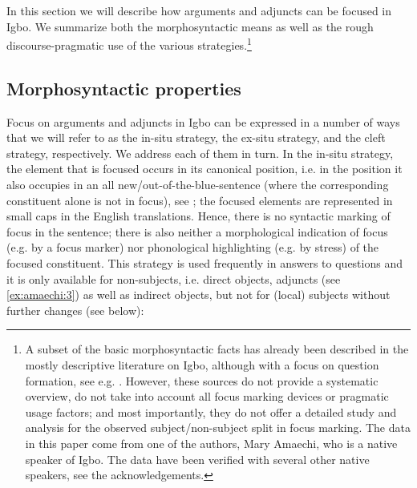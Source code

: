 \documentclass[output=paper,colorlinks,citecolor=brown]{langscibook}
\begin{document}
In this section we will describe how arguments and adjuncts can be focused in Igbo. We summarize both the morphosyntactic means as well as the rough discourse-pragmatic use of the various strategies.\footnote{A subset of the basic morphosyntactic facts has already been described in the mostly descriptive literature on Igbo, although with a focus on question formation, see e.g. \citet{Goldsmith1981, Ikekeonwu1987, Uwalaka1991, Mmaduagwu2012, Nwankwegu2015}. However, these sources do not provide a systematic overview, do not take into account all focus marking devices or pragmatic usage factors; and most importantly, they do not offer a detailed study and analysis for the observed  subject\slash non-subject split in focus marking. The data in this paper come from one of the authors, Mary Amaechi, who is a native speaker of Igbo. The data have been verified with several other native speakers, see the acknowledgements.}

\subsection{Morphosyntactic properties}\label{sec:amaechi:2.1}

Focus on arguments and adjuncts in Igbo can be expressed in a number of ways that we will refer to as the in-situ strategy, the ex-situ strategy, and the cleft strategy, respectively. We address each of them in turn. In the in-situ strategy, the element that is focused occurs in its canonical position, i.e. in the position it also occupies in an all new\slash out-of-the-blue-sentence (where the corresponding constituent alone is not in focus), see ; the focused elements are represented in small caps in the English translations. Hence, there is no syntactic marking of focus in the sentence; there is also neither a morphological indication of focus (e.g. by a focus marker) nor phonological highlighting (e.g. by stress) of the focused constituent. This strategy is used frequently in answers to questions and it is only available for non-subjects, i.e. direct objects, adjuncts (see \ref{ex:amaechi:3}) as well as indirect objects, but not for (local) subjects without further changes (see below):
\end{document}
